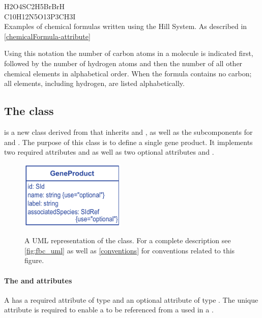 %
\begin{table}[h!]
  H2O4S\qquad C2H5Br\qquad BrH\\
  C10H12N5O13P3\qquad CH3I\\
  \caption{Examples of chemical formulas written using the Hill System. As
	described in \ref{chemicalFormula-attribute}}\label{table:hill}
\end{table}
%
Using this notation the number of carbon atoms in a molecule is indicated
first, followed by the number of hydrogen atoms and then the number of all
other chemical elements in alphabetical order. When the formula contains no
carbon; all elements, including hydrogen, are listed alphabetically.


\subsection{The \FBC {} class}
\label{geneproduct-class}
\GeneProduct is a new \FBC class derived from \SBML \SBase that inherits
 and , as well as the subcomponents for
\Annotation and \Notes. The purpose of this class is to define a single gene
product. It implements two required attributes  and  as
well as two optional attributes  and .

\begin{figure}[h]
  \centering
  \includegraphics[width=5cm]{images/v2harmony_fbc_geneproduct.pdf}\\
  \caption{A UML representation of the \FBCPackage \GeneProduct class. For a complete description see \ref{fig:fbc_uml} as well as \ref{conventions} for conventions related to this figure.}
  \label{fig:fbc_uml_geneproduct}
\end{figure}

\paragraph{The  and  attributes}
A \GeneProduct has a required attribute  of type 
and an optional attribute  of type . The
unique  attribute is required to enable a \GeneProduct to be
referenced from a \GeneProductRef used in a \GeneProductAssociation.

